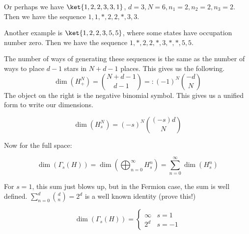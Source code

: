 \documentclass{article}
\begin{document}
Or perhaps we have $\ket{1,2,2,3,3,1}$, $d=3,N=6,n_1=2,n_2=2,n_3=2$. Then we have the sequence $1,1,*,2,2,*,3,3$.

Another example is $\ket{1,2,2,3,5,5}$, where some states have occupation number zero. Then we have the sequence $1,*,2,2,*,3,*,*,5,5$.

The number of ways of generating these sequences is the same as the number of ways to place $d-1$ stars in $N+d-1$ places. This gives us the following.
\begin{equation}
\dim(H_+^N) = {{N+d-1}\choose{d-1}} =: (-1)^N {{-d}\choose N}
\end{equation}
The object on the right is the negative binomial symbol. This gives us a unified form to write our dimensions.

\begin{equation}
\dim(H_s^N) = (-s)^N {{(-s)d}\choose{N}}
\end{equation}

Now for the full space:

\[\dim(\Gamma_s(H))=\dim\left(\bigoplus_{n=0}^\infty H_s^n\right) = \sum_{n=0}^\infty \dim(H_s^n)\]

For $s=1$, this sum just blows up, but in the Fermion case, the sum is well defined. $\sum_{n=0}^d {d \choose n} = 2^d$ is a well known identity (prove this!)

\begin{equation}
\dim(\Gamma_s(H)) = \begin{cases}\infty & s = 1 \\ 2^d & s=-1\end{cases}
\end{equation}
\end{document}
